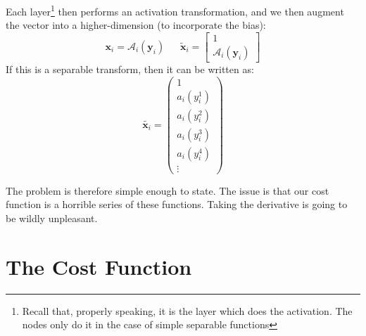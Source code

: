 \documentclass[a4paper,openany,11pt]{book}
\renewcommand\vec[1]{\boldsymbol{\mathbf{#1}}}
\begin{document}
			Each layer\footnote{Recall that, properly speaking, it is the layer which does the activation. The nodes only do it in the case of simple separable functions} then performs an activation transformation, and we then augment the vector into a higher-dimension (to incorporate the bias):
			\begin{equation}
				\vec{x}_i = \mathcal{A}_i(\vec{y}_i) ~~~~~~~ \tilde{\vec{x}}_i = \begin{bmatrix} 1 \\\mathcal{A}_i(\vec{y}_i)\end{bmatrix}
			\end{equation}
			If this is a separable transform, then it can be written as:
			\begin{equation}
				\tilde{\vec{x}_i} = \begin{pmatrix}
					1 \\ a_i\left( y_i^1\right) \\ a_i\left( y_i^2\right) \\ a_i\left( y_i^3\right)\\ a_i\left( y_i^4\right) \\ \vdots 
				\end{pmatrix}
			\end{equation}
			
			The problem is therefore simple enough to state. The issue is that our cost function is a horrible series of these functions. Taking the derivative is going to be wildly unpleasant. 
			\newcommand\afunc[2]
			{
				\mathcal{A}_{#1}\left(\begin{matrix}\vec{w}^1_{#1} \cdot#2 \\ \vec{w}^2_{#1} \cdot#2 \\  \vec{w}^3_{#1} \cdot#2  \\ \vdots \end{matrix} \right)
			}



		\section{The Cost Function}
\end{document}
